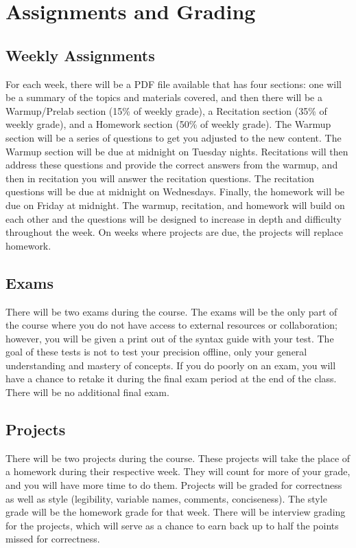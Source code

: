 \section{Assignments and Grading}
\subsection{Weekly Assignments}

For each week, there will be a PDF file available that has four sections: one will be a summary of the topics and materials covered, and then there will be a Warmup/Prelab section (15\% of weekly grade), a Recitation section (35\% of weekly grade), and a Homework section (50\% of weekly grade). The Warmup section will be a series of questions to get you adjusted to the new content. The Warmup section will be due at midnight on Tuesday nights. Recitations will then address these questions and provide the correct answers from the warmup, and then in recitation you will answer the recitation questions.  The recitation questions will be due at midnight on Wednesdays. Finally, the homework will be due on Friday at midnight. The warmup, recitation, and homework will build on each other and the questions will be designed to increase in depth and difficulty throughout the week. On weeks where projects are due, the projects will replace homework. 

\subsection{Exams}

There will be two exams during the course. The exams will be the only part of the course where you do not have access to external resources or collaboration; however, you will be given a print out of the syntax guide with your test. The goal of these tests is not to test your precision offline, only your general understanding and mastery of concepts. If you do poorly on an exam, you will have a chance to retake it during the final exam period at the end of the class. There will be no additional final exam.

\subsection{Projects}

There will be two projects during the course. These projects will take the place of a homework during their respective week. They will count for more of your grade, and you will have more time to do them.  Projects will be graded for correctness as well as style (legibility, variable names, comments, conciseness). The style grade will be the homework grade for that week. There will be interview grading for the projects, which will serve as a chance to earn back up to half the points missed for correctness.

